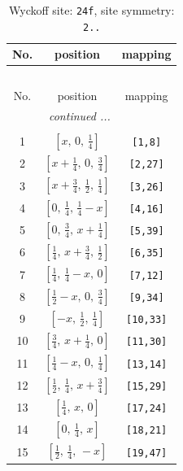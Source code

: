 \documentclass[fleqn,8pt]{jsarticle}
\begin{document}
\renewcommand{\arraystretch}{1.2}
\begin{longtable}{ccc}
\caption{Wyckoff site: {\tt 24f}, site symmetry: {\tt 2..}}
 \\
 \hline \hline
No. & position & mapping \\ \hline \endfirsthead

\multicolumn{2}{l}{\tablename\ \thetable{}} \\
 \hline \hline
No. & position & mapping \\ \hline \endhead

 \hline \hline
\multicolumn{2}{r}{\footnotesize\it continued ...} \\ \endfoot

 \hline \hline
\multicolumn{2}{r}{} \\ \endlastfoot

1 & $\left[ x,\, 0,\, \frac{1}{4} \right]$ & {\tt [1,8]} \\ \hline
2 & $\left[ x + \frac{1}{4},\, 0,\, \frac{3}{4} \right]$ & {\tt [2,27]} \\ \hline
3 & $\left[ x + \frac{3}{4},\, \frac{1}{2},\, \frac{1}{4} \right]$ & {\tt [3,26]} \\ \hline
4 & $\left[ 0,\, \frac{1}{4},\, \frac{1}{4} - x \right]$ & {\tt [4,16]} \\ \hline
5 & $\left[ 0,\, \frac{3}{4},\, x + \frac{1}{4} \right]$ & {\tt [5,39]} \\ \hline
6 & $\left[ \frac{1}{4},\, x + \frac{3}{4},\, \frac{1}{2} \right]$ & {\tt [6,35]} \\ \hline
7 & $\left[ \frac{1}{4},\, \frac{1}{4} - x,\, 0 \right]$ & {\tt [7,12]} \\ \hline
8 & $\left[ \frac{1}{2} - x,\, 0,\, \frac{3}{4} \right]$ & {\tt [9,34]} \\ \hline
9 & $\left[ - x,\, \frac{1}{2},\, \frac{1}{4} \right]$ & {\tt [10,33]} \\ \hline
10 & $\left[ \frac{3}{4},\, x + \frac{1}{4},\, 0 \right]$ & {\tt [11,30]} \\ \hline
11 & $\left[ \frac{1}{4} - x,\, 0,\, \frac{1}{4} \right]$ & {\tt [13,14]} \\ \hline
12 & $\left[ \frac{1}{2},\, \frac{1}{4},\, x + \frac{3}{4} \right]$ & {\tt [15,29]} \\ \hline
13 & $\left[ \frac{1}{4},\, x,\, 0 \right]$ & {\tt [17,24]} \\ \hline
14 & $\left[ 0,\, \frac{1}{4},\, x \right]$ & {\tt [18,21]} \\ \hline
15 & $\left[ \frac{1}{2},\, \frac{1}{4},\, - x \right]$ & {\tt [19,47]} \\ \hline

\end{longtable}
\end{document}

